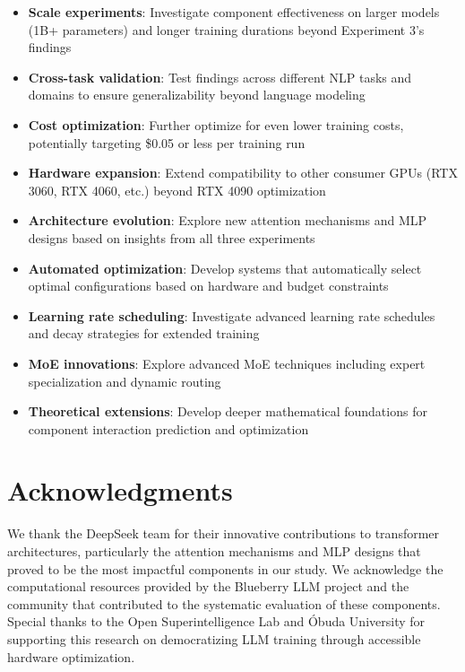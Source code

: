 \documentclass[11pt,a4paper]{article}
\begin{document}
\begin{itemize}
    \item \textbf{Scale experiments}: Investigate component effectiveness on larger models (1B+ parameters) and longer training durations beyond Experiment 3's findings
    \item \textbf{Cross-task validation}: Test findings across different NLP tasks and domains to ensure generalizability beyond language modeling
    \item \textbf{Cost optimization}: Further optimize for even lower training costs, potentially targeting \$0.05 or less per training run
    \item \textbf{Hardware expansion}: Extend compatibility to other consumer GPUs (RTX 3060, RTX 4060, etc.) beyond RTX 4090 optimization
    \item \textbf{Architecture evolution}: Explore new attention mechanisms and MLP designs based on insights from all three experiments
    \item \textbf{Automated optimization}: Develop systems that automatically select optimal configurations based on hardware and budget constraints
    \item \textbf{Learning rate scheduling}: Investigate advanced learning rate schedules and decay strategies for extended training
    \item \textbf{MoE innovations}: Explore advanced MoE techniques including expert specialization and dynamic routing
    \item \textbf{Theoretical extensions}: Develop deeper mathematical foundations for component interaction prediction and optimization
\end{itemize}

\section*{Acknowledgments}

We thank the DeepSeek team for their innovative contributions to transformer architectures, particularly the attention mechanisms and MLP designs that proved to be the most impactful components in our study. We acknowledge the computational resources provided by the Blueberry LLM project and the community that contributed to the systematic evaluation of these components. Special thanks to the Open Superintelligence Lab and Óbuda University for supporting this research on democratizing LLM training through accessible hardware optimization.
\end{document}
